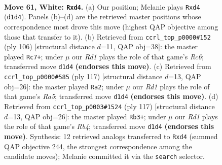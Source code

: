 \documentclass[11pt]{article}
\begin{document}
\clearpage

\begin{figure}[p]\centering
\begin{subfigure}{0.46\textwidth}\centering
\resizebox{\linewidth}{!}{%
\newchessgame
\chessboard[
  setfen={7k/3n4/8/6rp/p2p4/P7/8/3R3K w - - 0 61},
  showmover=false,
  pgfstyle=straightmove, color=movearrow, markmove={d1-d4}
]}
\caption{}
\end{subfigure}\hfill
\begin{subfigure}{0.46\textwidth}\centering
\resizebox{\linewidth}{!}{%
\newchessgame
\chessboard[
  setfen={8/7k/1PR5/8/8/2p1p1P1/2r5/6K1 w - - 0 54},
  showmover=false,
  pgfstyle=straightmove, color=movearrow, markmove={c6-c7}
]}
\caption{}
\end{subfigure}
\\[4pt]
\begin{subfigure}{0.46\textwidth}\centering
\resizebox{\linewidth}{!}{%
\newchessgame
\chessboard[
  setfen={6k1/R7/P7/4K3/r6p/8/6P1/8 b - - 0 59},
  showmover=false,
  pgfstyle=straightmove, color=movearrow, markmove={a4-a2}
]}
\caption{}
\end{subfigure}\hfill
\begin{subfigure}{0.46\textwidth}\centering
\resizebox{\linewidth}{!}{%
\newchessgame
\chessboard[
  setfen={1R6/1P4k1/8/1r4p1/8/4K2P/8/8 b - - 16 59},
  showmover=false,
  pgfstyle=straightmove, color=movearrow, markmove={b5-b3}
]}
\caption{}
\end{subfigure}
\caption{\textbf{Move 61, White: \texttt{Rxd4}.} (a) Our position; Melanie plays \texttt{Rxd4} (\texttt{d1d4}). Panels (b)--(d) are the retrieved master positions whose correspondence most drove this move (highest QAP objective among those that transfer to it). (b) Retrieved from \texttt{ccrl\_top\_p0000\#152} (ply 106) [structural distance $d$=11, QAP obj=38]: the master played \texttt{Rc7+}; under $\mu$ our \emph{Rd1} plays the role of that game's \emph{Rc6}; transferred move \texttt{d1d4} \textbf{(endorses this move)}. (c) Retrieved from \texttt{ccrl\_top\_p0000\#585} (ply 117) [structural distance $d$=13, QAP obj=26]: the master played \texttt{Ra2}; under $\mu$ our \emph{Rd1} plays the role of that game's \emph{Ra5}; transferred move \texttt{d1d4} \textbf{(endorses this move)}. (d) Retrieved from \texttt{ccrl\_top\_p0003\#1524} (ply 117) [structural distance $d$=13, QAP obj=26]: the master played \texttt{Rb3+}; under $\mu$ our \emph{Rd1} plays the role of that game's \emph{Rb4}; transferred move \texttt{d1d4} \textbf{(endorses this move)}. Synthesis: 12 retrieved analogs transferred to \texttt{Rxd4} (summed QAP objective 244, the strongest correspondence among the candidate moves); Melanie committed it via the \texttt{search} selector.}
\label{fig:thought-m120}
\end{figure}
\end{document}
